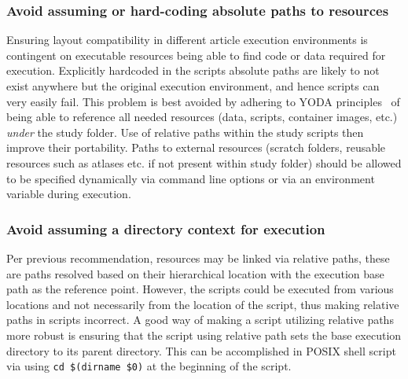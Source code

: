 \subsubsection{Avoid assuming or hard-coding absolute paths to resources}
Ensuring layout compatibility in different article execution environments is contingent on executable resources being able to find code or data required for execution.
Explicitly hardcoded in the scripts absolute paths are likely to not exist anywhere but the original execution environment, and hence scripts can very easily fail.
This problem is best avoided by adhering to YODA principles~\cite{yoda} of being able to reference all needed resources (data, scripts, container images, etc.) \emph{under} the study folder.
Use of relative paths within the study scripts then improve their portability.
Paths to external resources (scratch folders, reusable resources such as atlases etc. if not present within study folder) should be allowed to be specified dynamically via command line options or via an environment variable during execution.

\subsubsection{Avoid assuming a directory context for execution}
Per previous recommendation, resources may be linked via relative paths, these are paths resolved based on their hierarchical location with the execution base path as the reference point.
However, the scripts could be executed from various locations and not necessarily from the location of the script, thus making relative paths in scripts incorrect.
A good way of making a script utilizing relative paths more robust is ensuring that the script using relative path sets the base execution directory to its parent directory.
This can be accomplished in POSIX shell script via using \texttt{cd \textquotedbl\$(dirname \textquotedbl\$0\textquotedbl)\textquotedbl} at the beginning of the script.

